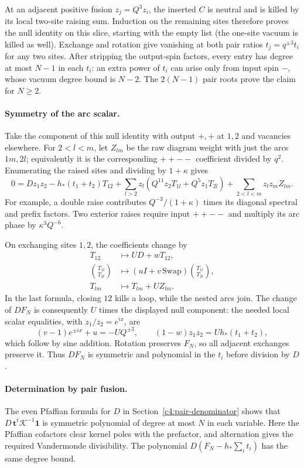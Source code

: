 At an adjacent positive fusion $z_j=Q^3z_i$, the inserted $C$ is neutral
and is killed by its local two-site raising sum. Induction on the
remaining sites therefore proves the null identity on this slice,
starting with the empty list (the one-site vacuum is killed as well).
Exchange and rotation give vanishing at both pair ratios
$t_j=q^{\pm3}t_i$ for any two sites. After stripping the output-spin
factors, every entry has degree at most $N-1$ in each $t_i$:
an extra power of $t_i$ can arise only from input spin $-$, whose
vacuum degree bound is $N-2$. The $2(N-1)$ pair roots prove the claim
for $N\ge2$.

\paragraph{Symmetry of the arc scalar.}
Take the component of this null identity with output $+,+$ at $1,2$
and vacancies elsewhere. For $2<l<m$, let $Z_{lm}$ be the raw diagram
weight with just the arcs $1m,2l$; equivalently it is the corresponding
$++--$ coefficient divided by $q^2$. Enumerating the raised sites and
dividing by $1+\kappa$ gives
\[
 0=D z_1z_2-h_*(t_1+t_2)T_{12}
   +\sum_{l>2}z_l(Q^{11}z_2T_{1l}+Q^5z_1T_{2l})
   +\sum_{2<l<m}z_lz_mZ_{lm}.
\]
For example, a double raise contributes $Q^{-3}/(1+\kappa)$ times its
diagonal spectral and prefix factors. Two exterior raises require
input $++--$ and multiply its arc phase by $\kappa^3Q^{-6}$.

On exchanging sites $1,2$, the coefficients change by
\[
 \begin{aligned}
 T_{12}&\longmapsto UD+wT_{12},\\
 \binom{T_{1l}}{T_{2l}}&\longmapsto
       (uI+v\,\mathrm{Swap})\binom{T_{1l}}{T_{2l}},\\
 T_{lm}&\longmapsto T_{lm}+UZ_{lm}.
 \end{aligned}
\]
In the last formula, closing $12$ kills a loop, while the nested arcs
join. The change of $DF_N$ is consequently $U$ times the displayed
null component: the needed local scalar equalities, with
$z_1/z_2=e^{ix}$, are
\[
 (v-1)e^{\pm ix}+u=-UQ^{\pm3},\qquad
 (1-w)z_1z_2=Uh_*(t_1+t_2),
\]
which follow by sine addition. Rotation preserves $F_N$, so all
adjacent exchanges preserve it. Thus $DF_N$ is symmetric and
polynomial in the $t_i$ before division by $D$.

\paragraph{Determination by pair fusion.}
The even Pfaffian formula for $D$ in Section~\ref{c4:pair-denominator}
shows that $D\,\mathbf t^t\mathcal K^{-1}\mathbf1$ is symmetric
polynomial of degree at most $N$ in each variable. Here the Pfaffian
cofactors clear kernel poles with the prefactor, and alternation gives
the required Vandermonde divisibility. The polynomial
$D(F_N-h_*\sum_i t_i)$ has the same degree bound.

